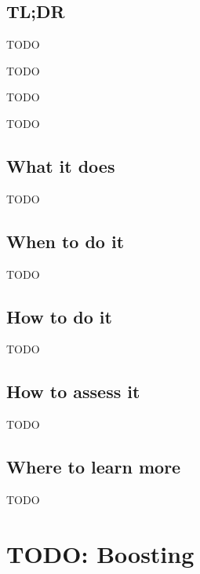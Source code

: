 \documentclass[
]{book}
\providecommand{\tightlist}{%
  \setlength{\itemsep}{0pt}\setlength{\parskip}{0pt}}
\begin{document}
\hypertarget{tldr-16}{%
\section{TL;DR}\label{tldr-16}}

\begin{description}
\tightlist
\item[What it does]
TODO
\item[When to do it]
TODO
\item[How to do it]
TODO
\item[How to assess it]
TODO
\end{description}

\hypertarget{what-it-does-16}{%
\section{What it does}\label{what-it-does-16}}

TODO

\hypertarget{when-to-do-it-16}{%
\section{When to do it}\label{when-to-do-it-16}}

TODO

\hypertarget{how-to-do-it-16}{%
\section{How to do it}\label{how-to-do-it-16}}

TODO

\hypertarget{how-to-assess-it-16}{%
\section{How to assess it}\label{how-to-assess-it-16}}

TODO

\hypertarget{where-to-learn-more-16}{%
\section{Where to learn more}\label{where-to-learn-more-16}}

TODO

\hypertarget{boosting}{%
\chapter{TODO: Boosting}\label{boosting}}
\end{document}

